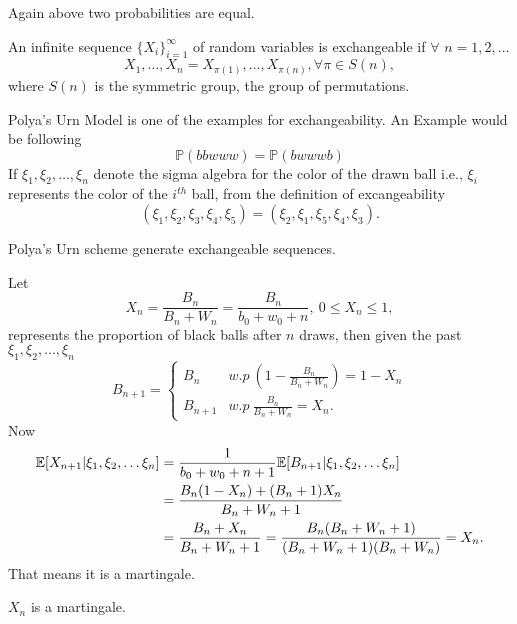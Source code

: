 \documentclass[a4paper,10pt,english]{article}
\begin{document}
Again above two probabilities are equal.
\begin{defn}
An infinite sequence $\{X_i\}_{i=1}^{\infty}$ of random variables is exchangeable if $\forall$ $n=1,2,\dots$
 \begin{equation*}
X_1,\dots,X_n=X_{\pi(1)},\dots ,X_{\pi(n)}, \forall \pi \in S(n),
\end{equation*}
where $S(n)$ is the symmetric group, the group of permutations.
\end{defn}
Polya's Urn Model is one of the examples for exchangeability. An Example would be following
 \begin{equation*}
\mathbb{P}(bbwww)=\mathbb{P}(bwwwb)
\end{equation*}
If $\xi_1,\xi_2,\dots,\xi_n$ denote the sigma algebra for the color of the drawn ball i.e., $\xi_i$ represents the color of the $i^{th}$ ball, from the definition of excangeability
\begin{equation*}
(\xi_1,\xi_2,\xi_3,\xi_4,\xi_5)=(\xi_2,\xi_1,\xi_5,\xi_4,\xi_3).
\end{equation*}
\begin{note}
Polya's Urn scheme generate exchangeable sequences.
\end{note}
Let 
\begin{equation*}
X_n=\frac{B_n}{B_n+W_n}=\frac{B_n}{b_0+w_0+n},\ 0\leq X_n \leq1,
\end{equation*}
represents the proportion of black balls after $n$ draws, then given the past $\xi_1,\xi_2,\dots,\xi_n$
\begin{equation*}
B_{n+1} = \begin{cases}
B_n  & w.p \ (1-\frac{B_n}{B_n+W_n}) = 1 -X_n \\
B_{n+1} & %
w.p \ \frac{B_n}{B_n+W_n} = X_n.
\end{cases}
\end{equation*}
Now
\begin{align*}
\mathbb{E}[X_{n+1}|\xi_1,\xi_2,\dots\xi_n]&=\frac{1}{b_0+w_0+n+1}\mathbb{E}[B_{n+1}|\xi_1,\xi_2,\dots\xi_n]\\
&=\frac{B_n(1-X_n)+(B_n+1)X_n}{B_n+W_n+1}\\
&=\frac{B_n+X_n}{B_n+W_n+1} = \frac{B_n(B_n+W_n+1)}{(B_n+W_n+1)(B_n+W_n)}=X_n.
\end{align*}
That means it is a martingale.
\begin{note}
$X_n$ is a martingale.
\end{note}
\end{document}

